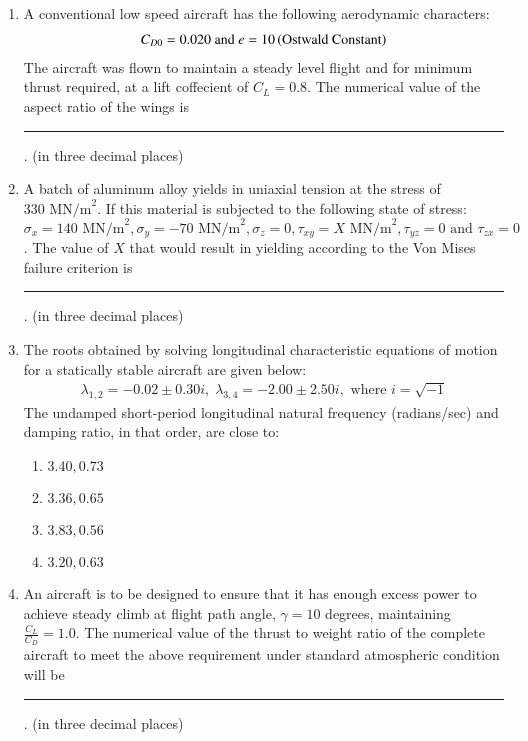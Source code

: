 \documentclass[journal]{IEEEtran}
\begin{document}
\begin{enumerate}[start=40]
\item A conventional low speed aircraft has the following aerodynamic characters:
\begin{align*}
    C_{D0}=0.020 \text{ and } e=10\left(\text{Ostwald Constant}\right)
\end{align*}
The aircraft was flown to maintain a steady level flight and for minimum thrust required, at a lift coffecient of $C_L=0.8$. The numerical value of the aspect ratio of the wings is \rule{1cm}{0.4 pt} . (in three decimal places)

\item A batch of aluminum alloy yields in uniaxial tension at the stress of $330  \text{ MN/m}^2$. If this material is subjected to the following state of stress: $\sigma_x = 140  \text{ MN/m}^2, \sigma_y = -70  \text{ MN/m}^2, \sigma_z = 0,  \tau_{xy} = X \text{ MN/m}^2, \tau_{yz} = 0 \text{ and } \tau_{zx} = 0$. The value of $X$ that would result in yielding according to the Von Mises failure criterion is \rule{1cm}{0.4 pt} . (in three decimal places)

\item The roots obtained by solving longitudinal characteristic equations of motion for a statically stable aircraft are given below:
\begin{align*}
    \lambda_{1,2} = -0.02 \pm 0.30i, \; \lambda_{3,4} = -2.00 \pm 2.50i, \text{ where } i = \sqrt{-1} 
\end{align*} 
The undamped short-period longitudinal natural frequency (radians/sec) and damping ratio, in that order, are close to:
\begin{multicols}{4}
\begin{enumerate}
\item $3.40, 0.73$
\item  $3.36, 0.65$
\item  $3.83, 0.56$
\item  $3.20, 0.63$
\end{enumerate}
\end{multicols}

\item An aircraft is to be designed to ensure that it has enough excess power to achieve steady climb at flight path angle, $\gamma = 10$ degrees, maintaining $\frac{C_L}{C_D} = 1.0$. The numerical value of the thrust to weight ratio of the complete aircraft to meet the above requirement under standard atmospheric condition will be \rule{1cm}{0.4 pt} . (in three decimal places)


\end{enumerate}
\end{document}
